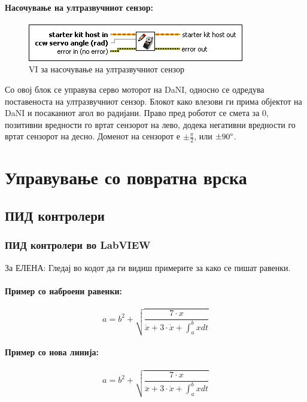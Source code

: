 \documentclass{article}
\begin{document}
\paragraph{Насочување на ултразвучниот сензор:\\}
\begin{figure}[H]
\includegraphics[width=0.45\linewidth]{write_servo.png}
\caption{VI за насочување на ултразвучниот сензор}
\label{fig:write_servo.png}
\raggedright
\end{figure}  
Со овој блок се управува серво моторот на DaNI, односно се одредува поставеноста на ултразвучниот сензор. Блокот како влезови ги прима објектот на DaNI и посаканиот агол во радијани. Право пред роботот се смета за 0, позитивни вредности го вртат сензорот на лево, додека негативни вредности го вртат сензорот на десно. Доменот на сензорот е $ \pm \frac{\pi}{2}$, или $\pm 90 \degree$.

\newpage
\section{Управување со повратна врска}
\subsection{ПИД контролери}
\subsubsection{ПИД контролери во LabVIEW}
За ЕЛЕНА:
Гледај во кодот да ги видиш примерите за како се пишат равенки.

\paragraph{Пример со наброени равенки:}
\begin{equation}
	a = b^2 + \sqrt{\frac{7 \cdot x}{{\ddot x + 3 \cdot \dot x + \int_a^b{x dt}}}}
\end{equation}


\paragraph{Пример со нова линија:}

$$ a = b^2 + \sqrt{\frac{7 \cdot x}{{\ddot x + 3 \cdot \dot x + \int_a^b{x dt}}}} $$
\end{document}
